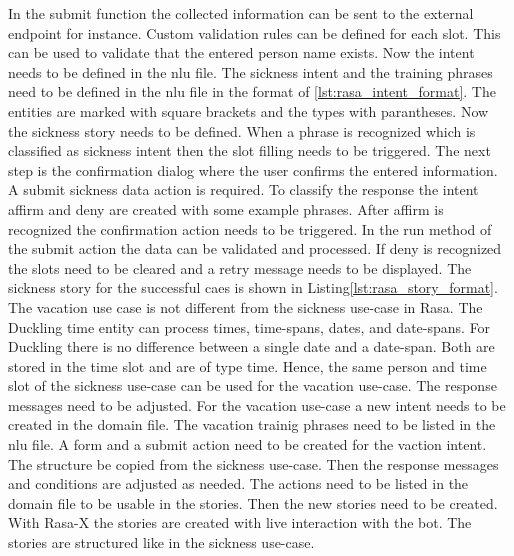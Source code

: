 In the submit function the collected information can be sent to the 
external endpoint for instance.
Custom validation rules can be defined for each slot.
This can be used to validate that the entered person name exists.
Now the intent needs to be defined in the nlu file.
The sickness intent and the training phrases need to be defined in the 
nlu file in the format of \ref{lst:rasa_intent_format}.
The entities are marked with square brackets and the types with parantheses.
Now the sickness story needs to be defined.
When a phrase is recognized which is classified as sickness intent then 
the slot filling needs to be triggered.
The next step is the confirmation dialog where the user confirms the entered information.
A submit sickness data action is required.
To classify the response the intent affirm and deny are created with some example phrases.
After affirm is recognized the confirmation action needs to be triggered.
In the run method of the submit action the data can be validated and processed.
If deny is recognized the slots need to be cleared and a retry message needs to be displayed.
The sickness story for the successful caes is shown in Listing\ref{lst:rasa_story_format}.
The vacation use case is not different from the sickness use-case in Rasa.
The Duckling time entity can process times, time-spans, dates, and date-spans.
For Duckling there is no difference between a single date and a date-span.
Both are stored in the time slot and are of type time.
Hence, the same person and time slot of the sickness use-case can be used for the 
vacation use-case.
The response messages need to be adjusted.
For the vacation use-case a new intent needs to be created in the domain file.
The vacation trainig phrases need to be listed in the nlu file.
A form and a submit action need to be created for the vaction intent.
The structure be copied from the sickness use-case.
Then the response messages and conditions are adjusted as needed.
The actions need to be listed in the domain file to be usable in the stories.
Then the new stories need to be created.
With Rasa-X the stories are created with live interaction with the bot.
The stories are structured like in the sickness use-case.








